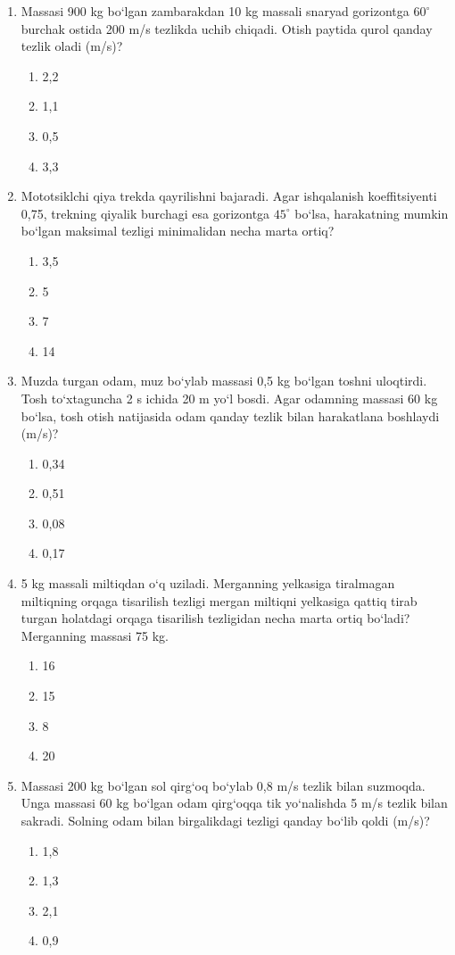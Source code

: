 \begin{enumerate}
	\item Massasi 900 kg bo‘lgan zambarakdan 10 kg massali snaryad gorizontga $60^\circ$ burchak ostida 200 m/s tezlikda uchib chiqadi. Otish paytida qurol qanday tezlik oladi (m/s)?
	\begin{enumerate}[label=\Alph*)]
		\item 2,2
		\item 1,1
		\item 0,5
		\item 3,3
	\end{enumerate}
	
	\item Mototsiklchi qiya trekda qayrilishni bajaradi. Agar ishqalanish koeffitsiyenti 0,75, trekning qiyalik burchagi esa gorizontga $45^\circ$ bo‘lsa, harakatning mumkin bo‘lgan maksimal tezligi minimalidan necha marta ortiq?
	\begin{enumerate}[label=\Alph*)]
		\item 3,5
		\item 5
		\item 7
		\item 14
	\end{enumerate}
	
	\item Muzda turgan odam, muz bo‘ylab massasi 0,5 kg bo‘lgan toshni uloqtirdi. Tosh to‘xtaguncha 2 s ichida 20 m yo‘l bosdi. Agar odamning massasi 60 kg bo‘lsa, tosh otish natijasida odam qanday tezlik bilan harakatlana boshlaydi (m/s)?
	\begin{enumerate}[label=\Alph*)]
		\item 0,34
		\item 0,51
		\item 0,08
		\item 0,17
	\end{enumerate}
	
	\item 5 kg massali miltiqdan o‘q uziladi. Merganning yelkasiga tiralmagan miltiqning orqaga tisarilish tezligi mergan miltiqni yelkasiga qattiq tirab turgan holatdagi orqaga tisarilish tezligidan necha marta ortiq bo‘ladi? Merganning massasi 75 kg.
	\begin{enumerate}[label=\Alph*)]
		\item 16
		\item 15
		\item 8
		\item 20
	\end{enumerate}
	
	\item Massasi 200 kg bo‘lgan sol qirg‘oq bo‘ylab 0,8 m/s tezlik bilan suzmoqda. Unga massasi 60 kg bo‘lgan odam qirg‘oqqa tik yo‘nalishda 5 m/s tezlik bilan sakradi. Solning odam bilan birgalikdagi tezligi qanday bo‘lib qoldi (m/s)?
	\begin{enumerate}[label=\Alph*)]
		\item 1,8
		\item 1,3
		\item 2,1
		\item 0,9
	\end{enumerate}
	

\end{enumerate}
